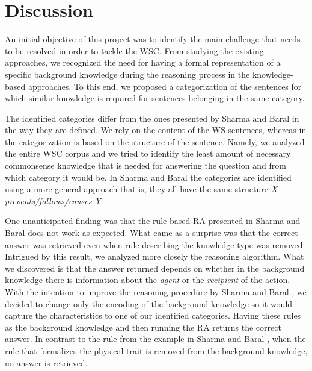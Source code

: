 \section{Discussion}
\label{section:Discussion}

An initial objective of this project was to identify the main challenge that needs to be resolved in order to tackle the WSC. From studying the existing approaches, we recognized the need for having a formal representation of a specific background knowledge during the reasoning process in the knowledge-based approaches. To this end, we proposed a categorization of the sentences for which similar knowledge is required for sentences belonging in the same category.

\begin{comment}
Emphasize these two
1. our categories are content based -> a combination of categories and knowledge about them could be a future work
2. we tried to identify the least amount of necessary commonsense knowledge (due to efficiency), which can consist of various different knowledge(s), that can exclude each other
\end{comment}

The identified categories differ from the ones presented by Sharma and Baral \cite{2018CommonsenseKT} in the way they are defined. We rely on the content of the WS sentences, whereas in \cite{2018CommonsenseKT} the categorization is based on the structure of the sentence. Namely, we analyzed the entire WSC corpus and we tried to identify the least amount of necessary commonsense knowledge that is needed for answering the question and from which category it would be.  In Sharma and Baral \cite{2018CommonsenseKT} the categories are identified using a more general approach that is, they all have the same structure \textit{X prevents/follows/causes Y}. 

One unanticipated finding was that the rule-based RA presented in Sharma and Baral \cite{2018CommonsenseKT} does not work as expected. What came as a surprise was that the correct answer was retrieved even when rule describing the knowledge type was removed. Intrigued by this result, we analyzed more closely the reasoning algorithm. What we discovered is that the answer returned depends on whether in the background knowledge there is information about the \textit{agent} or the \textit{recipient} of the action. With the intention to improve the reasoning procedure by  Sharma and Baral \cite{2018CommonsenseKT}, we decided to change only the encoding of the background knowledge so it would capture the characteristics to one of our identified categories. Having these rules as the background knowledge and then running the RA returns the correct answer. In contrast to the rule from the example in Sharma and Baral \cite{2018CommonsenseKT}, when the rule that formalizes the physical trait is removed from the background knowledge, no answer is retrieved. 

